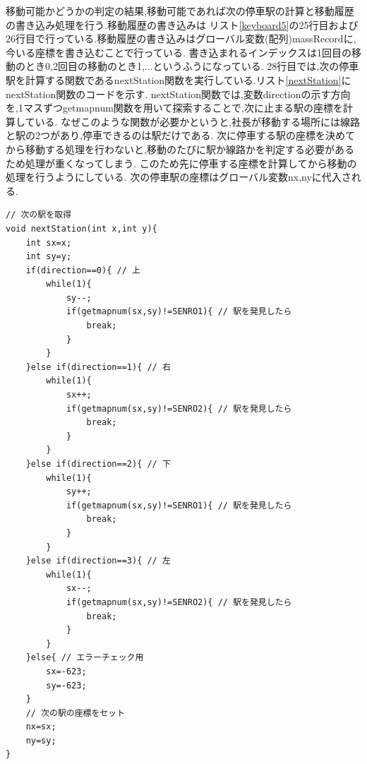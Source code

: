 \documentclass[a4j]{jarticle}
\begin{document}
    移動可能かどうかの判定の結果,移動可能であれば次の停車駅の計算と移動履歴の書き込み処理を行う.移動履歴の書き込みは
    リスト\ref{keyboard5}の25行目および26行目で行っている.移動履歴の書き込みはグローバル変数(配列)massRecordに,
    今いる座標を書き込むことで行っている. 書き込まれるインデックスは1回目の移動のとき0,2回目の移動のとき1,$\dots$というふうになっている.
    28行目では,次の停車駅を計算する関数であるnextStation関数を実行している.リスト\ref{nextStation}にnextStation関数のコードを示す.
    nextStation関数では,変数directionの示す方向を,1マスずつgetmapnum関数を用いて探索することで,次に止まる駅の座標を計算している.
    なぜこのような関数が必要かというと,社長が移動する場所には線路と駅の2つがあり,停車できるのは駅だけである.
    次に停車する駅の座標を決めてから移動する処理を行わないと,移動のたびに駅か線路かを判定する必要があるため処理が重くなってしまう.
    このため先に停車する座標を計算してから移動の処理を行うようにしている. 次の停車駅の座標はグローバル変数nx,nyに代入される.
    \begin{lstlisting}[basicstyle=\ttfamily\footnotesize, frame=single,label=nextStation,caption=nextStation関数]
// 次の駅を取得
void nextStation(int x,int y){
    int sx=x;
    int sy=y;
    if(direction==0){ // 上
        while(1){
            sy--;
            if(getmapnum(sx,sy)!=SENRO1){ // 駅を発見したら
                break;
            }
        }
    }else if(direction==1){ // 右
        while(1){
            sx++;
            if(getmapnum(sx,sy)!=SENRO2){ // 駅を発見したら
                break;
            }
        }
    }else if(direction==2){ // 下
        while(1){
            sy++;
            if(getmapnum(sx,sy)!=SENRO1){ // 駅を発見したら
                break;
            }
        }
    }else if(direction==3){ // 左
        while(1){
            sx--;
            if(getmapnum(sx,sy)!=SENRO2){ // 駅を発見したら
                break;
            }
        }
    }else{ // エラーチェック用
        sx=-623;
        sy=-623;
    }
    // 次の駅の座標をセット
    nx=sx;
    ny=sy;
}
    \end{lstlisting}  
\end{document}
